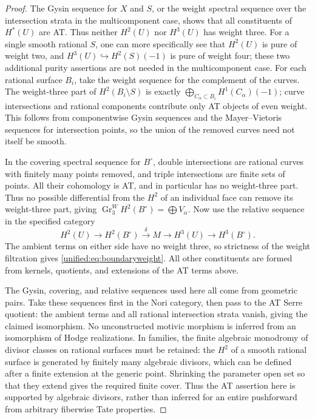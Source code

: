 \documentclass[11pt,a4paper,oneside]{article}
\theoremstyle{plain}
\theoremstyle{definition}
\theoremstyle{remark}
\numberwithin{equation}{section}
\begin{document}
\begin{proof}
The Gysin sequence for $X$ and $S$, or the weight spectral sequence over the intersection strata in the multicomponent case,
shows that all constituents of $H^*(U)$ are AT. Thus neither $H^2(U)$ nor $H^3(U)$ has weight three.
For a single smooth rational $S$, one can more specifically see that $H^2(U)$ is pure of weight two,
and $H^3(U)\hookrightarrow H^2(S)(-1)$ is pure of weight four;
these two additional purity assertions are not needed in the multicomponent case.
For each rational surface $B_i$, take the weight sequence for the complement of the curves.
The weight-three part of $H^2(B_i\setminus S)$ is exactly
$\bigoplus_{C_\alpha\subset B_i}H^1(C_\alpha)(-1)$;
curve intersections and rational components contribute only AT objects of even weight.
This follows from componentwise Gysin sequences and the Mayer--Vietoris sequences for intersection points,
so the union of the removed curves need not itself be smooth.

In the covering spectral sequence for $B^\circ$, double intersections are rational curves with finitely many points removed,
and triple intersections are finite sets of points. All their cohomology is AT, and in particular has no weight-three part.
Thus no possible differential from the $H^2$ of an individual face can remove its weight-three part,
giving $\operatorname{Gr}^W_3H^2(B^\circ)=\bigoplus V_\alpha$.
Now use the relative sequence in the specified category
\begin{equation}\label{unified:eq:boundaryrelative}
 H^2(U)\longrightarrow H^2(B^\circ)
 \overset{\delta}{\longrightarrow}M
 \longrightarrow H^3(U)\longrightarrow H^3(B^\circ).
\end{equation}
The ambient terms on either side have no weight three, so strictness of the weight filtration gives \eqref{unified:eq:boundaryweight}.
All other constituents are formed from kernels, quotients, and extensions of the AT terms above.

The Gysin, covering, and relative sequences used here all come from geometric pairs. Take these sequences first in the Nori category,
then pass to the AT Serre quotient: the ambient terms and all rational intersection strata vanish, giving the claimed isomorphism.
No unconstructed motivic morphism is inferred from an isomorphism of Hodge realizations.
In families, the finite algebraic monodromy of divisor classes on rational surfaces must be retained:
the $H^2$ of a smooth rational surface is generated by finitely many algebraic divisors, which can be defined after a finite extension at the generic point.
Shrinking the parameter open set so that they extend gives the required finite cover. Thus the AT assertion here
is supported by algebraic divisors, rather than inferred for an entire pushforward from arbitrary fiberwise Tate properties.
\end{proof}
\end{document}
